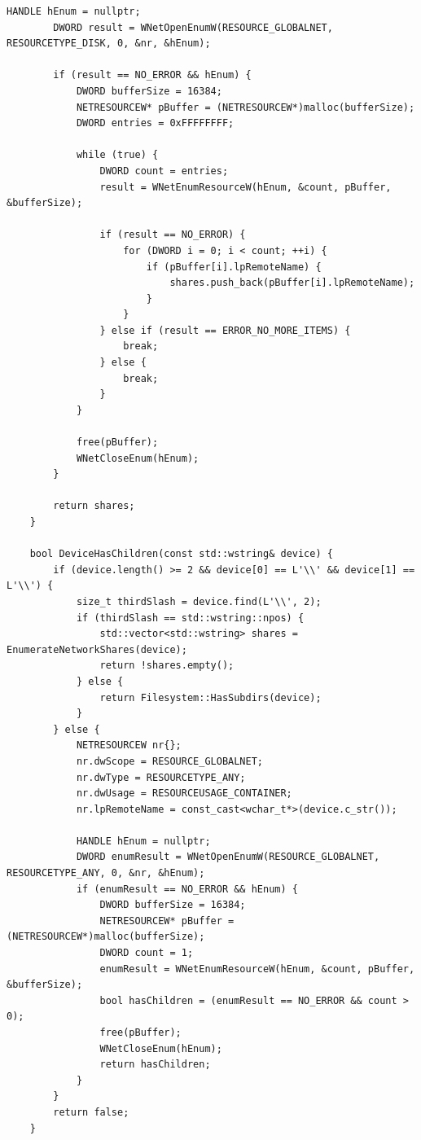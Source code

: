 \begin{lstlisting}[style=CodeListing]
        HANDLE hEnum = nullptr;
        DWORD result = WNetOpenEnumW(RESOURCE_GLOBALNET, RESOURCETYPE_DISK, 0, &nr, &hEnum);
        
        if (result == NO_ERROR && hEnum) {
            DWORD bufferSize = 16384;
            NETRESOURCEW* pBuffer = (NETRESOURCEW*)malloc(bufferSize);
            DWORD entries = 0xFFFFFFFF;
            
            while (true) {
                DWORD count = entries;
                result = WNetEnumResourceW(hEnum, &count, pBuffer, &bufferSize);
                
                if (result == NO_ERROR) {
                    for (DWORD i = 0; i < count; ++i) {
                        if (pBuffer[i].lpRemoteName) {
                            shares.push_back(pBuffer[i].lpRemoteName);
                        }
                    }
                } else if (result == ERROR_NO_MORE_ITEMS) {
                    break;
                } else {
                    break;
                }
            }
            
            free(pBuffer);
            WNetCloseEnum(hEnum);
        }
        
        return shares;
    }
    
    bool DeviceHasChildren(const std::wstring& device) {
        if (device.length() >= 2 && device[0] == L'\\' && device[1] == L'\\') {
            size_t thirdSlash = device.find(L'\\', 2);
            if (thirdSlash == std::wstring::npos) {
                std::vector<std::wstring> shares = EnumerateNetworkShares(device);
                return !shares.empty();
            } else {
                return Filesystem::HasSubdirs(device);
            }
        } else {
            NETRESOURCEW nr{};
            nr.dwScope = RESOURCE_GLOBALNET;
            nr.dwType = RESOURCETYPE_ANY;
            nr.dwUsage = RESOURCEUSAGE_CONTAINER;
            nr.lpRemoteName = const_cast<wchar_t*>(device.c_str());
            
            HANDLE hEnum = nullptr;
            DWORD enumResult = WNetOpenEnumW(RESOURCE_GLOBALNET, RESOURCETYPE_ANY, 0, &nr, &hEnum);
            if (enumResult == NO_ERROR && hEnum) {
                DWORD bufferSize = 16384;
                NETRESOURCEW* pBuffer = (NETRESOURCEW*)malloc(bufferSize);
                DWORD count = 1;
                enumResult = WNetEnumResourceW(hEnum, &count, pBuffer, &bufferSize);
                bool hasChildren = (enumResult == NO_ERROR && count > 0);
                free(pBuffer);
                WNetCloseEnum(hEnum);
                return hasChildren;
            }
        }
        return false;
    }
    

\end{lstlisting}
